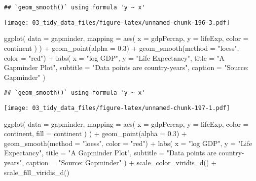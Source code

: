 \documentclass[
]{book}
\newenvironment{Shaded}{\begin{snugshade}}{\end{snugshade}}
\newcommand{\AttributeTok}[1]{\textcolor[rgb]{0.77,0.63,0.00}{#1}}
\newcommand{\FloatTok}[1]{\textcolor[rgb]{0.00,0.00,0.81}{#1}}
\newcommand{\FunctionTok}[1]{\textcolor[rgb]{0.00,0.00,0.00}{#1}}
\newcommand{\NormalTok}[1]{#1}
\newcommand{\SpecialCharTok}[1]{\textcolor[rgb]{0.00,0.00,0.00}{#1}}
\newcommand{\StringTok}[1]{\textcolor[rgb]{0.31,0.60,0.02}{#1}}
\begin{document}
\begin{verbatim}
## `geom_smooth()` using formula 'y ~ x'
\end{verbatim}

\texttt{[image: 03\_tidy\_data\_files/figure-latex/unnamed-chunk-196-3.pdf]}

\begin{Shaded}
\begin{Highlighting}[]
\FunctionTok{ggplot}\NormalTok{(}
  \AttributeTok{data =}\NormalTok{ gapminder,}
  \AttributeTok{mapping =} \FunctionTok{aes}\NormalTok{(}
    \AttributeTok{x =}\NormalTok{ gdpPercap, }\AttributeTok{y =}\NormalTok{ lifeExp,}
    \AttributeTok{color =}\NormalTok{ continent}
\NormalTok{  )}
\NormalTok{) }\SpecialCharTok{+}
  \FunctionTok{geom\_point}\NormalTok{(}\AttributeTok{alpha =} \FloatTok{0.3}\NormalTok{) }\SpecialCharTok{+}
  \FunctionTok{geom\_smooth}\NormalTok{(}\AttributeTok{method =} \StringTok{"loess"}\NormalTok{, }\AttributeTok{color =} \StringTok{"red"}\NormalTok{) }\SpecialCharTok{+}
  \FunctionTok{labs}\NormalTok{(}
    \AttributeTok{x =} \StringTok{"log GDP"}\NormalTok{,}
    \AttributeTok{y =} \StringTok{"Life Expectancy"}\NormalTok{,}
    \AttributeTok{title =} \StringTok{"A Gapminder Plot"}\NormalTok{,}
    \AttributeTok{subtitle =} \StringTok{"Data points are country{-}years"}\NormalTok{,}
    \AttributeTok{caption =} \StringTok{"Source: Gapminder"}
\NormalTok{  )}
\end{Highlighting}
\end{Shaded}

\begin{verbatim}
## `geom_smooth()` using formula 'y ~ x'
\end{verbatim}

\texttt{[image: 03\_tidy\_data\_files/figure-latex/unnamed-chunk-197-1.pdf]}

\begin{Shaded}
\begin{Highlighting}[]
\FunctionTok{ggplot}\NormalTok{(}
  \AttributeTok{data =}\NormalTok{ gapminder,}
  \AttributeTok{mapping =} \FunctionTok{aes}\NormalTok{(}
    \AttributeTok{x =}\NormalTok{ gdpPercap, }\AttributeTok{y =}\NormalTok{ lifeExp,}
    \AttributeTok{color =}\NormalTok{ continent,}
    \AttributeTok{fill =}\NormalTok{ continent}
\NormalTok{  )}
\NormalTok{) }\SpecialCharTok{+}
  \FunctionTok{geom\_point}\NormalTok{(}\AttributeTok{alpha =} \FloatTok{0.3}\NormalTok{) }\SpecialCharTok{+}
  \FunctionTok{geom\_smooth}\NormalTok{(}\AttributeTok{method =} \StringTok{"loess"}\NormalTok{, }\AttributeTok{color =} \StringTok{"red"}\NormalTok{) }\SpecialCharTok{+}
  \FunctionTok{labs}\NormalTok{(}
    \AttributeTok{x =} \StringTok{"log GDP"}\NormalTok{,}
    \AttributeTok{y =} \StringTok{"Life Expectancy"}\NormalTok{,}
    \AttributeTok{title =} \StringTok{"A Gapminder Plot"}\NormalTok{,}
    \AttributeTok{subtitle =} \StringTok{"Data points are country{-}years"}\NormalTok{,}
    \AttributeTok{caption =} \StringTok{"Source: Gapminder"}
\NormalTok{  ) }\SpecialCharTok{+}
  \FunctionTok{scale\_color\_viridis\_d}\NormalTok{() }\SpecialCharTok{+}
  \FunctionTok{scale\_fill\_viridis\_d}\NormalTok{()}
\end{Highlighting}
\end{Shaded}
\end{document}
